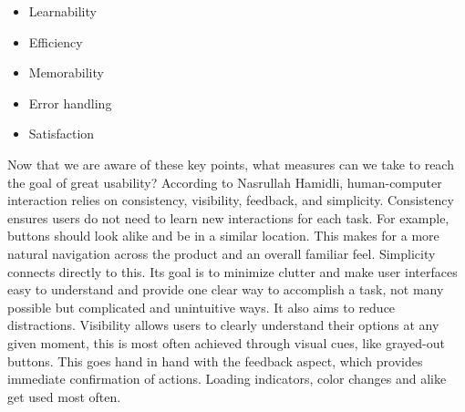 \begin{itemize}
    \item Learnability

    \item Efficiency

    \item Memorability

    \item Error handling

    \item Satisfaction
\end{itemize}
\autocite{Paul:Usability101}

\blankLine

Now that we are aware of these key points, what measures can we take to reach the goal of great usability? According to Nasrullah Hamidli, human-computer interaction relies on consistency, visibility, feedback, and simplicity. Consistency ensures users do not need to learn new interactions for each task. For example, buttons should look alike and be in a similar location. This makes for a more natural navigation across the product and an overall familiar feel. Simplicity connects directly to this. Its goal is to minimize clutter and make user interfaces easy to understand and provide one clear way to accomplish a task, not many possible but complicated and unintuitive ways. It also aims to reduce distractions. Visibility allows users to clearly understand their options at any given moment, this is most often achieved through visual cues, like grayed-out buttons. This goes hand in hand with the feedback aspect, which provides immediate confirmation of actions. Loading indicators, color changes and alike get used most often.


